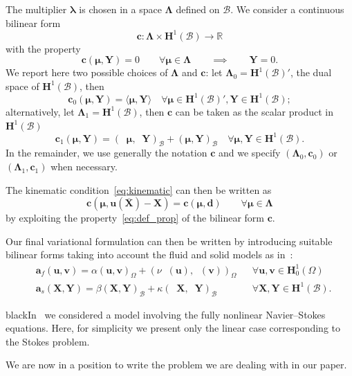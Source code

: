 \documentclass[oneside]{amsart} %
\newcommand{\numberset}{\mathbb}
\newcommand{\R}{\numberset{R}}
\DeclareMathOperator*{\Grads}{{\underline{\boldsymbol{\varepsilon}}}}%
\DeclareMathOperator{\grads}{\boldsymbol\nabla_s}
\newcommand\Huo{\mathbf{H}^1_0(\Omega)}%
\newcommand\Hub{\mathbf{H}^1(\B)} %
\newcommand\Hubd{\Hub'} %
\newcommand\B{\mathcal B} %
\renewcommand\u{\mathbf{u}} %
\renewcommand\a{\mathbf{a}} %
\renewcommand\v{\mathbf{v}} %
\renewcommand\d{\mathbf{d}} %
\renewcommand\c{\mathbf{c}} %
\newcommand\X{\mathbf{X}} %
\newcommand\Xbar{\overline{\X}} %
\newcommand\Y{\mathbf{Y}} %
\newcommand\LL{{\boldsymbol{\Lambda}}} %
\newcommand\llambda{\boldsymbol\lambda} %
\newcommand\mmu{{\boldsymbol\mu}} %
\newcommand\DB{\begin{color}{black}}
\newcommand\BD{\end{color}}
\begin{document}
	The multiplier $\llambda$ is chosen in a space $\LL$ defined on $\B$.
	We consider a continuous bilinear form $$\c:\LL\times\Hub\to\R$$
	with the property
	\begin{equation}\label{eq:def_prop}
		\c(\mmu,\Y) = 0 \qquad \forall \mmu\in\LL \qquad \implies \qquad \Y=0.
	\end{equation}
	We report here two possible choices of $\LL$ and $\c$: let $\LL_0=\Hubd$, the dual space of $\Hub$, then
	\begin{equation}
		\label{eq:c_l2}
		\c_0(\mmu,\Y) = \langle\mmu,\Y\rangle \quad \forall\mmu\in \Hubd,\Y\in \Hub;
	\end{equation}
	alternatively, let $\LL_1=\Hub$, then $\c$ can be taken as the scalar product
	in $\Hub$
	\begin{equation}
		\label{eq:c_h1}
		\c_1(\mmu,\Y) = (\grads\mmu,\grads\Y)_\B + (\mmu,\Y)_\B\quad \forall\mmu,\Y\in \Hub.
	\end{equation}
	In the remainder, we use generally the notation $\c$ and we specify
	$(\LL_0,\c_0)$ or $(\LL_1,\c_1)$ when necessary.
	
	The kinematic condition~\eqref{eq:kinematic} can then be written as
	\[
	\c(\mmu,\u(\Xbar)-\X) = \c(\mmu,\d) \qquad \forall\mmu\in\LL
	\]
	by exploiting the property~\eqref{eq:def_prop} of the bilinear form $\c$.
	
	Our final variational formulation can then be written by introducing suitable
	bilinear forms taking into account the fluid and solid models as
	in~\cite{stat}:
	\begin{equation}\label{eq:forme}
		\begin{aligned}
			&\a_f(\u,\v)=\alpha(\u,\v)_\Omega+(\nu\Grads(\u),\Grads(\v))_\Omega&& \forall\u,\v\in\Huo\\
			&\a_s(\X,\Y) = \beta(\X,\Y)_\B+\kappa (\grads\X,\grads\Y)_\B && \forall\X,\Y\in\Hub.
		\end{aligned}
	\end{equation}
	\DB In~\cite{stat} we considered a model involving the fully nonlinear
	Navier--Stokes equations. Here, for simplicity we present only the linear case
	corresponding to the Stokes problem.\BD
	
	We are now in a position to write the problem we are dealing with in our
	paper.
	
\end{document}
